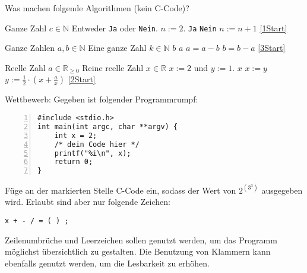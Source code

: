 \documentclass{uebungszettel}
\begin{document}
\begin{aufg}
Was machen folgende Algorithmen (kein C-Code)?

\begin{algorithm}[H]
\caption{}
\begin{algorithmic}[1]
\REQUIRE Ganze Zahl $c\in\mathbb{N}$
\ENSURE Entweder \verb|Ja| oder \verb|Nein|.
\STATE \SET $n := 2$.
 \label{1Start}
\RETURN \verb|Ja|
\ENDIF
{}
\RETURN \verb|Nein|
\ENDIF
\STATE \SET $n := n + 1$
\STATE \GOTO \ref{1Start}
\end{algorithmic}
\end{algorithm}

\begin{algorithm}[H]
\caption{}
\begin{algorithmic}[1]
\REQUIRE Ganze Zahlen $a,b\in\mathbb{N}$
\ENSURE Eine ganze Zahl $k\in\mathbb{N}$
\RETURN $b$
\ENDIF
{} \label{3Start}
\RETURN $a$
\ENDIF
{}
\STATE \SET $a = a - b$
\ELSE 
\STATE \SET $b = b - a$
\ENDIF
\STATE \GOTO \ref{3Start}
\end{algorithmic}
\end{algorithm}

\begin{algorithm}[H]
\caption{}
\begin{algorithmic}[1]
\REQUIRE Reelle Zahl $a\in\mathbb{R}_{\ge 0}$
\ENSURE Reine reelle Zahl $x\in\mathbb{R}$
\STATE \SET $x := 2$ und $y := 1$.
 \label{2Start} 
\RETURN $x$
\ENDIF
\STATE \SET $x := y$
\STATE \SET $y := \frac{1}{2} \cdot \left(x+\frac{a}{x}\right)$
\STATE \GOTO \ref{2Start}
\end{algorithmic}
\end{algorithm}
\end{aufg}

\begin{aufg}
Wettbewerb: Gegeben ist folgender Programmrumpf:
\begin{codelisting}
\begin{lstlisting}[numbers=left,numberstyle=\tiny,frame=tlrb]
#include <stdio.h>
int main(int argc, char **argv) {
	int x = 2;
	/* dein Code hier */
	printf("%i\n", x);
	return 0;
}
\end{lstlisting}
\end{codelisting}

Füge an der markierten Stelle C-Code ein, sodass der Wert von
$2^{\left(3^3\right)}$ ausgegeben wird. Erlaubt sind aber nur folgende Zeichen:
\begin{center}
    \texttt{x \quad + \quad - \quad * \quad / \quad = \quad ( \quad ) \quad ;}
\end{center}
Zeilenumbrüche und Leerzeichen sollen genutzt werden, um das Programm möglichst
übersichtlich zu gestalten. Die Benutzung von Klammern kann ebenfalls
genutzt werden, um die Lesbarkeit zu erhöhen.
\end{aufg}
\end{document}
